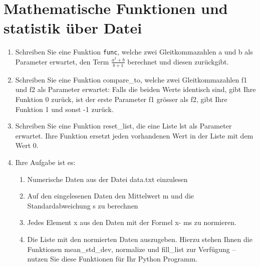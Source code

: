 \documentclass[11pt, oneside]{book}
\begin{document}
\section{Mathematische Funktionen und statistik über Datei}

\begin{enumerate}[label=(\alph*)]
    \item Schreiben Sie eine Funktion \texttt{func}, welche zwei Gleitkommazahlen a und b als Parameter erwartet, den Term $\frac{a^2 + b}{b + 1}$ berechnet und diesen zur\"uckgibt.
    \item Schreiben Sie eine Funktion compare\_to, welche zwei Gleitkommazahlen f1 und f2 als Parameter erwartet: Falls die beiden Werte identisch sind, gibt Ihre Funktion 0 zur\"uck, ist der erste Parameter f1 grösser als f2, gibt Ihre Funktion 1 und sonst -1 zur\"uck.
    \item Schreiben Sie eine Funktion reset\_list, die eine Liste lst als Parameter erwartet. Ihre Funktion ersetzt jeden vorhandenen Wert in der Liste mit dem Wert 0.
    \item Ihre Aufgabe ist es:
    \begin{enumerate}[label=(\alph*)]
        \item Numerische Daten aus der Datei data.txt einzulesen
        \item Auf den eingelesenen Daten den Mittelwert m und die Standardabweichung s zu berechnen
        \item Jedes Element x aus den Daten mit der Formel x- ms zu normieren.
        \item Die Liste mit den normierten Daten auszugeben. \newline
        Hierzu stehen Ihnen die Funktionen mean\_std\_dev, normalize und fill\_list zur Verf\"ugung – nutzen Sie diese Funktionen f\"ur Ihr Python Programm.
    \end{enumerate}
\end{enumerate}
\end{document}
